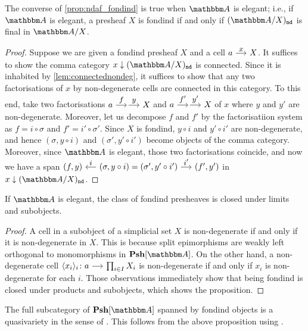 \documentclass[a4paper,dvipsnames,11pt,backend=luatex]{amsart} %
\begin{document}
\begin{proposition}
	The converse of \cref{prop:ndaf_fondind} is true when $\dgm{A}$ is elegant; i.e.,
	if $\dgm{A}$ is elegant,
	a presheaf $X$ is fondind if and only if $\ndcat{X}$ is final in $\dgm{A}/X$.
\end{proposition}
\begin{proof}
	Suppose we are given a fondind presheaf $X$ and a cell $a\arr"x"X$.
	It suffices to show the comma category $x\downarrow\ndcat{X}$ is connected. Since it is inhabited by \cref{lem:connectednondeg}, it suffices to show that
	any two factorisations of $x$ by non-degenerate cells are connected in this category.
	To this end, take two factorisations $a\arr"f"\arr"y"X$ and $a\arr"f'"\arr"y'"X$ of $x$
	where $y$ and $y'$ are non-degenerate. Moreover, let us decompose $f$ and $f'$ by the factorisatiion system
	as $f=i\circ\sigma$ and $f'=i'\circ\sigma'$.
	Since $X$ is fondind, $y\circ i$ and $y'\circ i'$ are non-degenerate, and hence $(\sigma,y\circ i)$ and $(\sigma',y'\circ i')$ become objects of the comma category.
	Moreover, since $\dgm{A}$ is elegant, those two factorisations coincide,
	and now we have a span $(f,y)\arr"i"[leftarrow](\sigma,y\circ i)=(\sigma',y'\circ i')\arr"i'"(f',y')$ in $x\downarrow\ndcat{X}$.
\end{proof}
\begin{proposition}
	If $\dgm{A}$ is elegant, the class of fondind presheaves is closed under limits and subobjects.
\end{proposition}
\begin{proof}
	A cell in a subobject of a simplicial set $X$ is non-degenerate if and only if it is non-degenerate in $X$.
	This is because split epimorphisms are weakly left orthogonal to monomorphisms in $\Psh[\dgm{A}]$.
	On the other hand, a non-degenerate cell $\langle x_i\rangle_{i}\colon a \arr \prod_{i\in I}X_i$ is non-degenerate
	if and only if $x_i$ is non-degenerate for each $i$.
	Those observations immediately show that being fondind is closed under products and subobjects, which shows the proposition.
\end{proof}
\begin{remark}
	The full subcategory of $\Psh[\dgm{A}]$ spanned by fondind objects is a quasivariety in the sense of \cite[16.12]{AHS90}.
	This follows from the above proposition using \cite[Theorem 16.8 and Theorem 16.14]{AHS90}.
\end{remark}

\printbibliography
\end{document}
